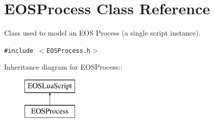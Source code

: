 \hypertarget{classEOSProcess}{
\section{EOSProcess Class Reference}
\label{classEOSProcess}
}
Class used to model an EOS Process (a single script instance).  


{\tt \#include $<$EOSProcess.h$>$}

Inheritance diagram for EOSProcess::\begin{figure}[H]
\begin{center}
\leavevmode
\includegraphics[height=2cm]{classEOSProcess}
\end{center}
\end{figure}
